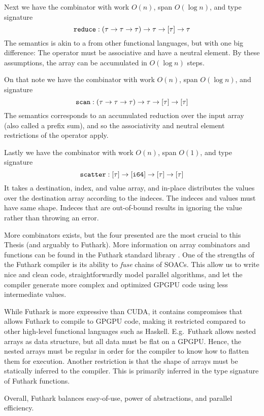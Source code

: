 Next we have the combinator  with work $O(n)$, span $O(\log n)$, and
type signature
\begin{equation}
\mathtt{reduce}:(\tau \to \tau \to \tau) \to \tau \to \mathtt{[}\tau\mathtt{]} \to \tau
\end{equation}
The semantics is akin to a  from other functional languages, but with
one big difference: The operator must be associative and have a neutral
element. By these assumptions, the array can be accumulated in $O(\log n)$
steps.

On that note we have the combinator  with work $O(n)$, span
$O(\log n)$, and signature
\begin{equation}
\mathtt{scan}:(\tau \to \tau \to \tau) \to \tau \to \mathtt{[}\tau\mathtt{]} \to \mathtt{[}\tau\mathtt{]}
\end{equation}
The semantics corresponds to an accumulated reduction over the input array (also
called a prefix sum), and so the associativity and neutral element restrictions
of the operator apply.

Lastly we have the combinator  with work $O(n)$, span $O(1)$, and
type signature
\begin{equation}
\mathtt{scatter}:\mathtt{[}\tau\mathtt{]} \to \mathtt{[}\mathtt{i64}\mathtt{]} \to \mathtt{[}\tau\mathtt{]} \to \mathtt{[}\tau\mathtt{]}
\end{equation}
It takes a destination, index, and value array, and in-place distributes the
values over the destination array according to the indeces. The indeces and
values must have same shape. Indeces that are out-of-bound results in ignoring
the value rather than throwing an error.

More combinators exists, but the four presented are the most crucial to this
Thesis (and arguably to Futhark). More information on array combinators and
functions can be found in the Futhark standard library \cite{futprelude}. One of
the strengths of the Futhark compiler is its ability to \textit{fuse} chains of
SOACs. This allow us to write nice and clean code, straightforwardly model
parallel algorithms, and let the compiler generate more complex and optimized
GPGPU code using less intermediate values.

While Futhark is more expressive than CUDA, it contains compromises that allows
Futhark to compile to GPGPU code, making it restricted compared to other
high-level functional languages such as Haskell. E.g.\ Futhark allows nested
arrays as data structure, but all data must be flat on a GPGPU. Hence, the
nested arrays must be regular in order for the compiler to know how to flatten
them for execution. Another restriction is that the shape of arrays must be
statically inferred to the compiler. This is primarily inferred in the
type signature of Futhark functions.

Overall, Futhark balances easy-of-use, power of abstractions, and parallel
efficiency.

